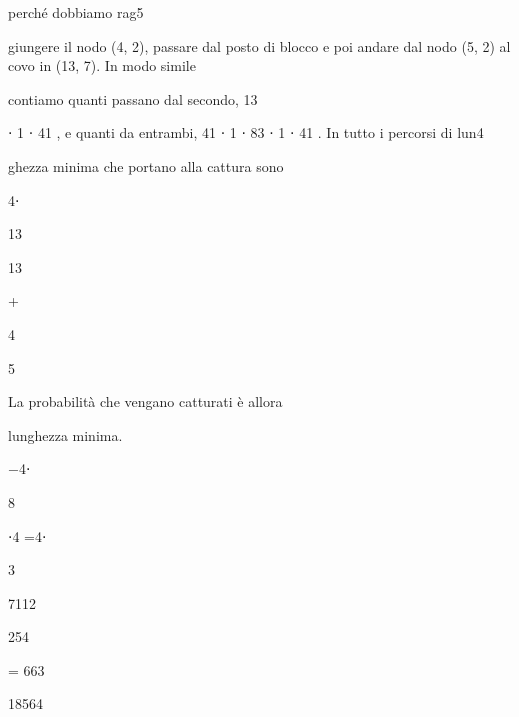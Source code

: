 \documentclass[a4paper,portrait,12pt]{article}
\begin{document}
\begin{flushleft}
perch\'{e} dobbiamo rag5
\end{flushleft}


\begin{flushleft}
giungere il nodo (4, 2), passare dal posto di blocco e poi andare dal nodo (5, 2) al covo in (13, 7). In modo simile
\end{flushleft}


\begin{flushleft}
contiamo quanti passano dal secondo, 13
\end{flushleft}


\begin{flushleft}
⋅ 1 ⋅ 41 , e quanti da entrambi, 41 ⋅ 1 ⋅ 83 ⋅ 1 ⋅ 41 . In tutto i percorsi di lun4
\end{flushleft}


\begin{flushleft}
ghezza minima che portano alla cattura sono
\end{flushleft}


4⋅





13


13


+


4


5





\begin{flushleft}
La probabilit\`{a} che vengano catturati \`{e} allora
\end{flushleft}


\begin{flushleft}
lunghezza minima.
\end{flushleft}





$-$4⋅





8


⋅4 =4⋅


3





7112


254


= 663


18564
\end{document}
